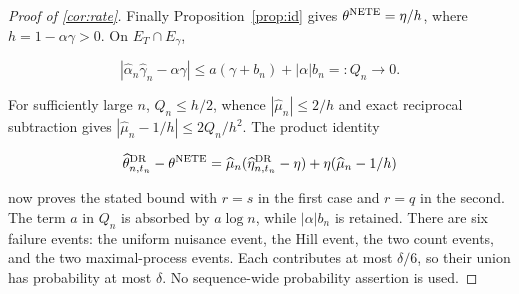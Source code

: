\documentclass[12pt]{article}
\theoremstyle{plain}
\theoremstyle{definition}
\begin{document}
\begin{proof}[Proof of \cref{cor:rate}]
Finally Proposition~\ref{prop:id} gives $\theta^{\operatorname{NETE}}=\eta/h$, where $h=1-\alpha\gamma>0$. On $E_T\cap E_\gamma$,

\[
|\hat\alpha_n\hat\gamma_n-\alpha\gamma|\leq a(\gamma+b_n)+|\alpha|b_n=:Q_n\to0.
\]

For sufficiently large $n$, $Q_n\leq h/2$, whence $|\hat\mu_n|\leq2/h$ and exact reciprocal subtraction gives $|\hat\mu_n-1/h|\leq2Q_n/h^2$. The product identity

\[
\widehat\theta_{n,t_n}^{\text{DR}}-\theta^{\operatorname{NETE}}=\widehat\mu_n(\widehat\eta_{n,t_n}^{\operatorname{DR}}-\eta)+\eta(\widehat\mu_n-1/h)
\]

now proves the stated bound with $r=s$ in the first case and $r=q$ in the second. The term $a$ in $Q_n$ is absorbed by $a\log n$, while $|\alpha|b_n$ is retained. There are six failure events: the uniform nuisance event, the Hill event, the two count events, and the two maximal-process events. Each contributes at most $\delta/6$, so their union has probability at most $\delta$. No sequence-wide probability assertion is used. 
\end{proof}
  
\end{document}
